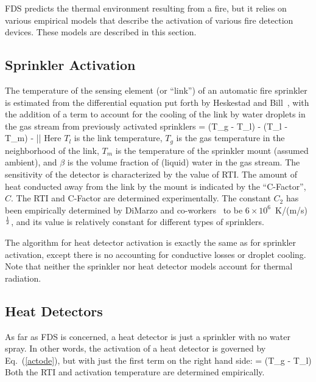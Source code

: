 \documentclass[11pt]{book}
\begin{document}
FDS predicts the thermal environment resulting from a fire, but it relies on various empirical models that describe the
activation of various fire detection devices. These models are described in this section.


\subsection{Sprinkler Activation}

The temperature of the sensing element (or ``link'') of an automatic fire sprinkler is estimated from
the differential equation put forth by Heskestad and Bill~\cite{Heskestad:3},
with the addition of a term to account for the cooling of the link
by water droplets in the gas stream from previously activated
sprinklers
\be {} =  (T_g - T_l) -
    (T_l - T_m) -  \beta |\bu|
   \label{actode} \ee
Here $T_l$ is the link temperature, $T_g$ is the gas temperature in the
neighborhood of the link, $T_m$ is the temperature of the sprinkler
mount (assumed ambient),
and $\beta$ is the volume fraction of (liquid) water in the
gas stream. The sensitivity of the detector is characterized by
the value of RTI. The amount of heat conducted away from the
link by the mount is indicated by the ``C-Factor'', $C$. The RTI and
C-Factor are determined experimentally. The constant
$C_2$ has been empirically determined by DiMarzo and
co-workers~\cite{Ruffino:1,Ruffino:2,Gavelli:1} to
be $6\times 10^6$~K/(m/s)$^{\frac{1}{2}}$, and its value is relatively constant
for different types of sprinklers.

The algorithm for heat detector activation is exactly the same as for
sprinkler activation, except there is no accounting for conductive losses or
droplet cooling. Note that neither the sprinkler nor heat detector models account for
thermal radiation.

\subsection{Heat Detectors}

As far as FDS is concerned, a heat detector is just a sprinkler with no water spray. In other words, the activation of a heat
detector is governed by Eq.~(\ref{actode}), but with just the first term on the right hand side:
\be {} =  (T_g - T_l)  \label{heatactode} \ee
Both the RTI and activation temperature are determined empirically.
\end{document}
